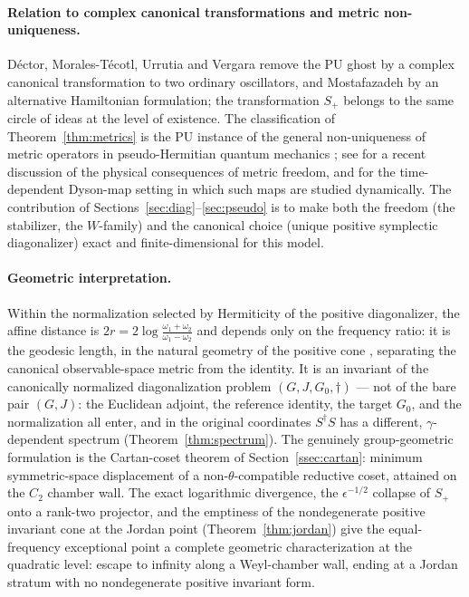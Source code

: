\documentclass[11pt]{article}
\theoremstyle{definition}
\theoremstyle{remark}
\newcommand{\w}{\omega}
\newcommand{\dg}{\dagger}
\begin{document}
\paragraph{Relation to complex canonical transformations and metric
non-uniqueness.}
D\'ector, Morales-T\'ecotl, Urrutia and Vergara \cite{Dector2009} remove the
PU ghost by a complex canonical transformation to two ordinary oscillators,
and Mostafazadeh \cite{Mostafazadeh2010PU} by an alternative Hamiltonian
formulation; the transformation $S_+$ belongs to the same circle of ideas at
the level of existence.  The classification of
Theorem~\ref{thm:metrics} is the PU instance of the general non-uniqueness
of metric operators in pseudo-Hermitian quantum mechanics
\cite{SGH1992,Mostafazadeh2010}; see \cite{Znojil2025} for a recent
discussion of the physical consequences of metric freedom, and
\cite{FringFrith2017,Fring2023} for the time-dependent Dyson-map
\cite{Dyson1956} setting in which such maps are studied dynamically.  The
contribution of Sections~\ref{sec:diag}--\ref{sec:pseudo} is to make both the
freedom (the stabilizer, the $W$-family) and the canonical choice (unique
positive symplectic diagonalizer) exact and finite-dimensional for this
model.

\paragraph{Geometric interpretation.}
Within the normalization selected by Hermiticity of the positive
diagonalizer, the affine distance is
$2r=2\log\frac{\w_1+\w_2}{\w_1-\w_2}$ and depends only on the frequency
ratio: it is the geodesic length, in the natural geometry of the positive
cone \cite{Bhatia2007}, separating the canonical observable-space metric
from the identity.  It is an invariant of the canonically normalized
diagonalization problem $(G,J,G_0,\dg)$ --- not of the bare pair $(G,J)$:
the Euclidean adjoint, the reference identity, the target $G_0$, and the
normalization all enter, and in the original coordinates $S^{\dg}S$ has a
different, $\gamma$-dependent spectrum
(Theorem~\ref{thm:spectrum}).  The genuinely group-geometric formulation
is the Cartan-coset theorem of Section~\ref{ssec:cartan}: minimum
symmetric-space displacement of a non-$\theta$-compatible reductive
coset, attained on the $C_2$ chamber wall.  The exact logarithmic
divergence, the $\epsilon^{-1/2}$ collapse of $S_+$ onto a rank-two
projector, and the emptiness of the nondegenerate positive invariant cone
at the Jordan point (Theorem~\ref{thm:jordan}) give the equal-frequency
exceptional point a complete geometric characterization at the quadratic
level: escape to infinity along a Weyl-chamber wall, ending at a Jordan
stratum with no nondegenerate positive invariant form.
\end{document}
